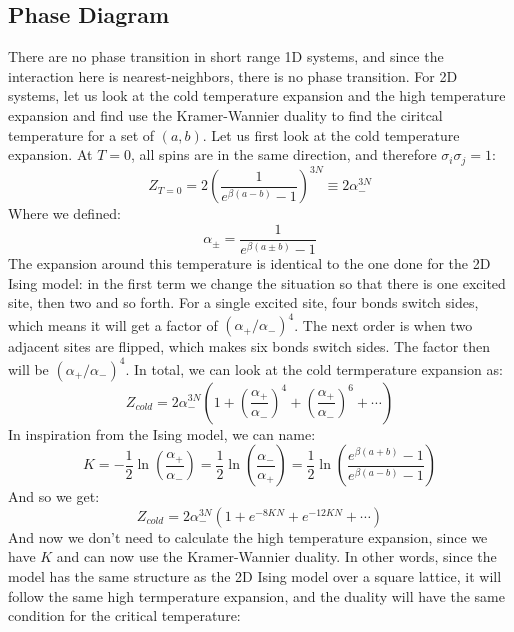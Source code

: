 \documentclass{article}
\begin{document}
\subsection{Phase Diagram}
There are no phase transition in short range 1D systems, and since the interaction here is nearest-neighbors, there is no phase transition. For 2D systems, let us look at the cold temperature expansion and the high temperature expansion and find use the Kramer-Wannier duality to find the ciritcal temperature for a set of $(a,b)$.
\newline
Let us first look at the cold temperature expansion. At $T = 0$, all spins are in the same direction, and therefore $\sigma_i\sigma_j = 1$:
\begin{equation}
    Z_{T=0} = 2\left(\frac{1}{e^{\beta\left(a - b\right)}-1}\right)^{3N} \equiv 2\alpha_{-}^{3N}
\end{equation}
Where we defined:
\begin{equation}
    \alpha_{\pm} = \frac{1}{e^{\beta\left(a \pm b\right)}-1}
\end{equation}
The expansion around this temperature is identical to the one done for the 2D Ising model: in the first term we change the situation so that there is one excited site, then two and so forth. For a single excited site, four bonds switch sides, which means it will get a factor of $(\alpha_{+}/\alpha_{-})^{4}$. The next order is when two adjacent sites are flipped, which makes six bonds switch sides. The factor then will be $(\alpha_{+}/\alpha_{-})^{4}$. In total, we can look at the cold termperature expansion as:
\begin{equation}
    Z_{cold} = 2\alpha_{-}^{3N}\left(1 + \left(\frac{\alpha_{+}}{\alpha_{-}}\right)^4 + \left(\frac{\alpha_{+}}{\alpha_{-}}\right)^6 + \cdots\right)
\end{equation}
In inspiration from the Ising model, we can name:
\begin{equation}
    K = -\frac{1}{2}\ln(\frac{\alpha_{+}}{\alpha_{-}}) = \frac{1}{2}\ln(\frac{\alpha_{-}}{\alpha_{+}}) = \frac{1}{2}\ln(\frac{e^{\beta\left(a + b\right)}-1}{e^{\beta\left(a - b\right)}-1})
\end{equation}
And so we get:
\begin{equation}
    Z_{cold} = 2\alpha_{-}^{3N}\left(1 + e^{-8KN} + e^{-12KN} + \cdots \right)
\end{equation}
And now we don't need to calculate the high temperature expansion, since we have $K$ and can now use the Kramer-Wannier duality. In other words, since the model has the same structure as the 2D Ising model over a square lattice, it will follow the same high termperature expansion, and the duality will have the same condition for the critical temperature:
\end{document}
